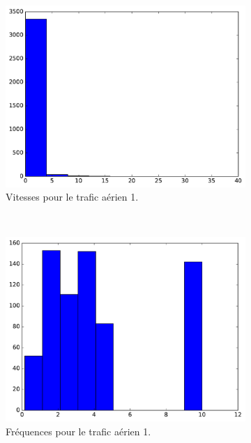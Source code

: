 	\begin{figure}
		\begin{subfigure}[t]{\subImgWaStats}
			\centering
			\includegraphics[width=\textwidth]{figures/ch3/mhA_speed}
			\caption{Vitesses pour le trafic aérien 1.}
			\label{fig:mhA_speed}
		\end{subfigure}
		~
		\begin{subfigure}[t]{\subImgWaStats}
			\centering
			\includegraphics[width=\textwidth]{figures/ch3/mhA_frequency}
			\caption{Fréquences pour le trafic aérien 1.}
			\label{fig:mhA_frequency}
		\end{subfigure}
		~
		\begin{subfigure}[t]{\subImgWaStats}

\end{subfigure}
\end{figure}
